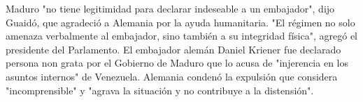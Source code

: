 \documentclass{article}%
\begin{document}
\newline%
%
Maduro "no tiene legitimidad para declarar indeseable a un embajador", dijo Guaidó, que agradeció a Alemania por la ayuda humanitaria. \newline%
\newline%
"El régimen no solo amenaza verbalmente al embajador, sino también a su integridad física", agregó el presidente del Parlamento.%
\newline%
%
El embajador alemán Daniel Kriener fue declarado persona non grata por el Gobierno de Maduro que lo acusa de "injerencia en los asuntos internos" de Venezuela.%
\newline%
%
Alemania condenó la expulsión que considera "incomprensible" y "agrava la situación y no contribuye a la distensión".%
\newline%
%
\end{document}
